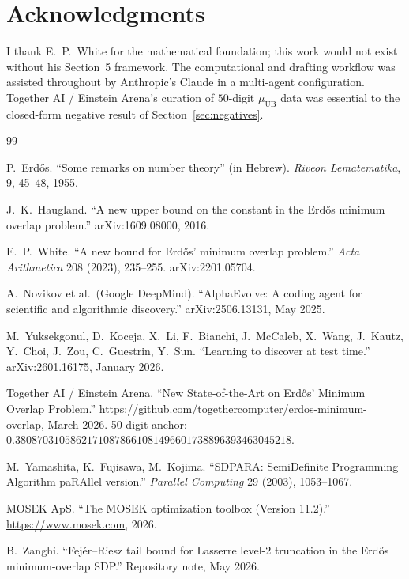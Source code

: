 \documentclass[11pt]{article}
\theoremstyle{plain}
\theoremstyle{definition}
\begin{document}
\section*{Acknowledgments}

I thank E.~P.~White for the mathematical foundation; this work would
not exist without his Section~5 framework. The computational and
drafting workflow was assisted throughout by Anthropic's Claude in a
multi-agent configuration. Together AI / Einstein Arena's curation of
$50$-digit $\mu_{\mathrm{UB}}$ data was essential to the closed-form
negative result of Section~\ref{sec:negatives}.


\begin{thebibliography}{99}

P.~Erd\H{o}s.
``Some remarks on number theory'' (in Hebrew).
\textit{Riveon Lematematika}, 9, 45--48, 1955.

J.~K.~Haugland.
``A new upper bound on the constant in the Erd\H{o}s minimum overlap problem.''
arXiv:1609.08000, 2016.

E.~P.~White.
``A new bound for Erd\H{o}s' minimum overlap problem.''
\textit{Acta Arithmetica} 208 (2023), 235--255. arXiv:2201.05704.

A.~Novikov et al.\ (Google DeepMind).
``AlphaEvolve: A coding agent for scientific and algorithmic discovery.''
arXiv:2506.13131, May 2025.

M.~Yuksekgonul, D.~Koceja, X.~Li, F.~Bianchi, J.~McCaleb, X.~Wang,
J.~Kautz, Y.~Choi, J.~Zou, C.~Guestrin, Y.~Sun.
``Learning to discover at test time.''
arXiv:2601.16175, January 2026.

Together AI / Einstein Arena.
``New State-of-the-Art on Erd\H{o}s' Minimum Overlap Problem.''
\url{https://github.com/togethercomputer/erdos-minimum-overlap}, March 2026.
50-digit anchor:
$0.38087031058621710878661081496601738896393463045218$.

M.~Yamashita, K.~Fujisawa, M.~Kojima.
``SDPARA: SemiDefinite Programming Algorithm paRAllel version.''
\textit{Parallel Computing} 29 (2003), 1053--1067.

MOSEK ApS.
``The MOSEK optimization toolbox (Version 11.2).''
\url{https://www.mosek.com}, 2026.

B.~Zanghi.
``Fej\'er--Riesz tail bound for Lasserre level-2 truncation
in the Erd\H{o}s minimum-overlap SDP.''
Repository note, May 2026.


\end{thebibliography}
\end{document}
